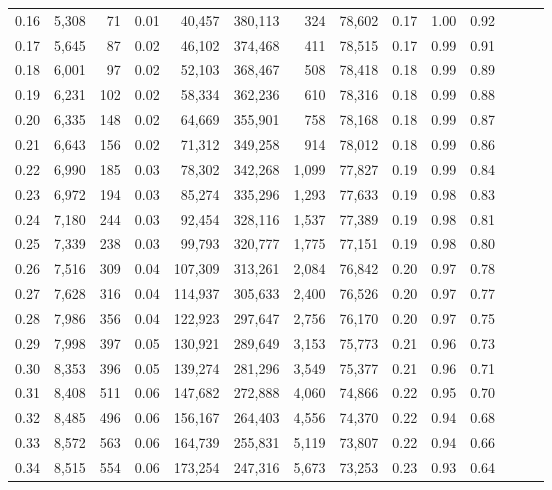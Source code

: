 \begin{tabular}{rrrrrrrrrrrrrr}
0.16 &  5,308 &     71 &  0.01 &   40,457 &  380,113 &     324 &  78,602 &  0.17 &  1.00 &      0.92 \\
0.17 &  5,645 &     87 &  0.02 &   46,102 &  374,468 &     411 &  78,515 &  0.17 &  0.99 &      0.91 \\
0.18 &  6,001 &     97 &  0.02 &   52,103 &  368,467 &     508 &  78,418 &  0.18 &  0.99 &      0.89 \\
0.19 &  6,231 &    102 &  0.02 &   58,334 &  362,236 &     610 &  78,316 &  0.18 &  0.99 &      0.88 \\
0.20 &  6,335 &    148 &  0.02 &   64,669 &  355,901 &     758 &  78,168 &  0.18 &  0.99 &      0.87 \\
0.21 &  6,643 &    156 &  0.02 &   71,312 &  349,258 &     914 &  78,012 &  0.18 &  0.99 &      0.86 \\
0.22 &  6,990 &    185 &  0.03 &   78,302 &  342,268 &   1,099 &  77,827 &  0.19 &  0.99 &      0.84 \\
0.23 &  6,972 &    194 &  0.03 &   85,274 &  335,296 &   1,293 &  77,633 &  0.19 &  0.98 &      0.83 \\
0.24 &  7,180 &    244 &  0.03 &   92,454 &  328,116 &   1,537 &  77,389 &  0.19 &  0.98 &      0.81 \\
0.25 &  7,339 &    238 &  0.03 &   99,793 &  320,777 &   1,775 &  77,151 &  0.19 &  0.98 &      0.80 \\
0.26 &  7,516 &    309 &  0.04 &  107,309 &  313,261 &   2,084 &  76,842 &  0.20 &  0.97 &      0.78 \\
0.27 &  7,628 &    316 &  0.04 &  114,937 &  305,633 &   2,400 &  76,526 &  0.20 &  0.97 &      0.77 \\
0.28 &  7,986 &    356 &  0.04 &  122,923 &  297,647 &   2,756 &  76,170 &  0.20 &  0.97 &      0.75 \\
0.29 &  7,998 &    397 &  0.05 &  130,921 &  289,649 &   3,153 &  75,773 &  0.21 &  0.96 &      0.73 \\
0.30 &  8,353 &    396 &  0.05 &  139,274 &  281,296 &   3,549 &  75,377 &  0.21 &  0.96 &      0.71 \\
0.31 &  8,408 &    511 &  0.06 &  147,682 &  272,888 &   4,060 &  74,866 &  0.22 &  0.95 &      0.70 \\
0.32 &  8,485 &    496 &  0.06 &  156,167 &  264,403 &   4,556 &  74,370 &  0.22 &  0.94 &      0.68 \\
0.33 &  8,572 &    563 &  0.06 &  164,739 &  255,831 &   5,119 &  73,807 &  0.22 &  0.94 &      0.66 \\
0.34 &  8,515 &    554 &  0.06 &  173,254 &  247,316 &   5,673 &  73,253 &  0.23 &  0.93 &      0.64 \\

\end{tabular}
